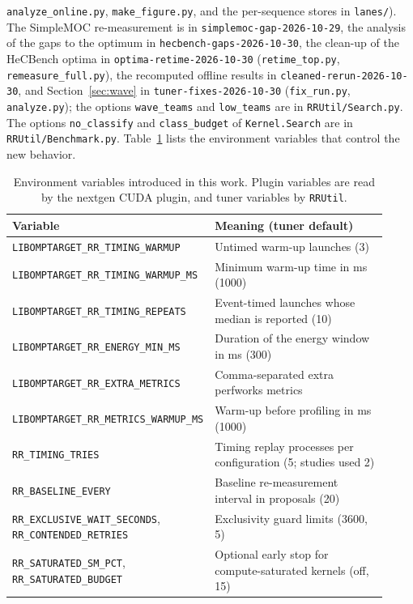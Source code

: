 \documentclass[10pt]{article}
\newcommand{\code}[1]{\texttt{#1}}
\begin{document}
\code{analyze\_online.py}, \code{make\_figure.py}, and the per-sequence stores in
\code{lanes/}). The SimpleMOC re-measurement is in \code{simplemoc-gap-2026-10-29}, the
analysis of the gaps to the optimum in \code{hecbench-gaps-2026-10-30}, the clean-up of the
HeCBench optima in \code{optima-retime-2026-10-30} (\code{retime\_top.py},
\code{remeasure\_full.py}), the recomputed offline results in
\code{cleaned-rerun-2026-10-30}, and Section~\ref{sec:wave} in
\code{tuner-fixes-2026-10-30} (\code{fix\_run.py}, \code{analyze.py}); the options
\code{wave\_teams} and \code{low\_teams} are in \code{RRUtil/Search.py}. The options \code{no\_classify} and \code{class\_budget} of
\code{Kernel.Search} are in \code{RRUtil/Benchmark.py}. Table~\ref{tab:env} lists the
environment variables that control the new behavior.

\begin{table}[t]
\centering
\caption{Environment variables introduced in this work. Plugin variables are
read by the nextgen CUDA plugin, and tuner variables by \code{RRUtil}.}
\label{tab:env}
\begin{tabular}{>{\raggedright\arraybackslash}p{0.42\linewidth}>{\raggedright\arraybackslash}p{0.5\linewidth}}
\toprule
Variable & Meaning (tuner default) \\
\midrule
\code{LIBOMPTARGET\_RR\_TIMING\_WARMUP} & Untimed warm-up launches (3) \\
\code{LIBOMPTARGET\_RR\_TIMING\_WARMUP\_MS} & Minimum warm-up time in ms (1000) \\
\code{LIBOMPTARGET\_RR\_TIMING\_REPEATS} & Event-timed launches whose median is reported (10) \\
\code{LIBOMPTARGET\_RR\_ENERGY\_MIN\_MS} & Duration of the energy window in ms (300) \\
\code{LIBOMPTARGET\_RR\_EXTRA\_METRICS} & Comma-separated extra perfworks metrics \\
\code{LIBOMPTARGET\_RR\_METRICS\_WARMUP\_MS} & Warm-up before profiling in ms (1000) \\
\code{RR\_TIMING\_TRIES} & Timing replay processes per configuration (5; studies used 2) \\
\code{RR\_BASELINE\_EVERY} & Baseline re-measurement interval in proposals (20) \\
\code{RR\_EXCLUSIVE\_WAIT\_SECONDS}, \code{RR\_CONTENDED\_RETRIES} & Exclusivity guard limits (3600, 5) \\
\code{RR\_SATURATED\_SM\_PCT}, \code{RR\_SATURATED\_BUDGET} & Optional early stop for compute-saturated kernels (off, 15) \\

\end{tabular}
\end{table}
\end{document}
